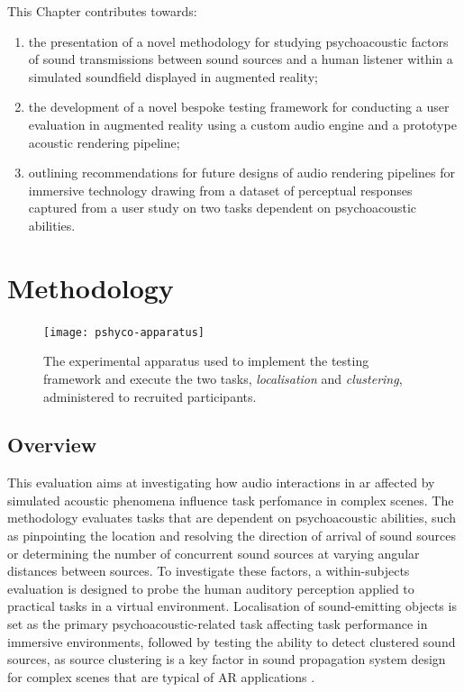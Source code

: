 This Chapter contributes towards:
\begin{enumerate}
    \item the presentation of a novel methodology for studying psychoacoustic factors of sound transmissions between sound sources and a human listener within a simulated soundfield displayed in augmented reality;
    \item the development of a novel bespoke testing framework for conducting a user evaluation in augmented reality using a custom audio engine and a prototype acoustic rendering pipeline;
    \item outlining recommendations for future designs of audio rendering pipelines for immersive technology drawing from a dataset of perceptual responses captured from a user study on two tasks dependent on psychoacoustic abilities.
\end{enumerate}

\section{Methodology}
\begin{figure}[htbp]
    \centering
    \texttt{[image: pshyco-apparatus]}
    \caption{The experimental apparatus used to implement the testing framework and execute the two tasks, \emph{localisation} and \emph{clustering}, administered to recruited participants.}
    \label{fig:psycho-apparatus}
\end{figure}

\subsection{Overview}
This evaluation aims at investigating how audio interactions in \acrshort{ar} affected by simulated acoustic phenomena influence task perfomance in complex scenes. The methodology evaluates tasks that are dependent on psychoacoustic abilities, such as pinpointing the location and resolving the direction of arrival of sound sources or determining the number of concurrent sound sources at varying angular distances between sources. To investigate these factors, a within-subjects evaluation is designed to probe the human auditory perception applied to practical tasks in a virtual environment. Localisation of sound-emitting objects is set as the primary psychoacoustic-related task affecting task performance in immersive environments, followed by testing the ability to detect clustered sound sources, as source clustering is a key factor in sound propagation system design for complex scenes that are typical of AR applications \citep{schissler2016interactive}. 


